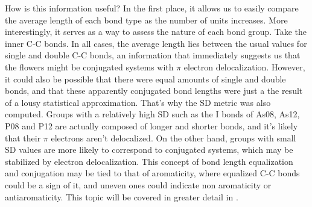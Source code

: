 How is this information useful?
In the first place, it allows us to easily compare the average length of each bond type as the number of units increases.
More interestingly, it serves as a way to assess the nature of each bond group.
Take the inner C-C bonds.
In all cases, the average length lies between the usual values for single and double C-C bonds, an information that immediately suggests us that the flowers might be conjugated systems with $\pi$ electron delocalization.
However, it could also be possible that there were equal amounts of single and double bonds, and that these apparently conjugated bond lengths were just a the result of a lousy statistical approximation.
That's why the SD metric was also computed.
Groups with a relatively high SD such as the I bonds of As08, As12, P08 and P12 are actually composed of longer and shorter bonds, and it's likely that their $\pi$ electrons aren't delocalized.
On the other hand, groups with small SD values are more likely to correspond to conjugated systems, which may be stabilized by electron delocalization.
This concept of bond length equalization and conjugation may be tied to that of aromaticity, where equalized C-C bonds could be a sign of it, and uneven ones could indicate non aromaticity or antiaromaticity. This topic will be covered in greater detail in .

